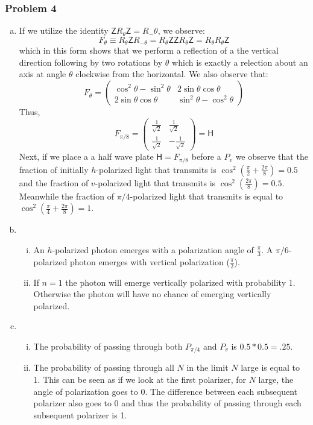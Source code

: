 \documentclass[a4paper,11pt]{article}
\begin{document}
\subsubsection*{Problem 4}
\begin{enumerate}[a)]
    \item If we utilize the identity $\mathsf{Z}R_\theta\mathsf{Z}=R_-\theta$, we observe:
        $$F_\theta\equiv R_\theta\mathsf{Z}R_{-\theta}=R_\theta\mathsf{Z}\mathsf{Z}R_\theta\mathsf{Z}=R_\theta R_\theta\mathsf{Z}$$
        which in this form shows that we perform a reflection of a the vertical direction following by two rotations by $\theta$ which is exactly a relection about an axis at angle $\theta$ clockwise from the horizontal. We also observe that:
        $$F_\theta=\left( \begin{array}{cc} \cos^2\theta-\sin^2\theta & 2\sin\theta\cos\theta \\ 2\sin\theta\cos\theta & \sin^2\theta-\cos^2\theta \end{array} \right)$$
        Thus, $$F_{\pi/8}=\left( \begin{array}{cc} \frac{1}{\sqrt{2}} &  \frac{1}{\sqrt{2}}\\  \frac{1}{\sqrt{2}}& -\frac{1}{\sqrt{2}}\end{array} \right)=\mathsf{H}$$
        Next, if we place a a half wave plate $\mathsf{H}=F_{\pi/8}$ before a $P_v$ we observe that the fraction of initially $h$-polarized light that transmits is $\cos^2(\frac{\pi}{2}+\frac{2\pi}{8})=0.5$ and the fraction of $v$-polarized light that transmits is $\cos^2(\frac{2\pi}{8})=0.5$. Meanwhile the fraction of $\pi/4$-polarized light that transmits is equal to $\cos^2(\frac{\pi}{4}+\frac{2\pi}{8})=1$.
    \item \begin{enumerate}[(i)]
            \item An $h$-polarized photon emerges with a polarization angle of $\frac{\pi}{3}$. A $\pi/6$-polarized photon emerges with vertical polarization ($\frac{\pi}{2}$).
            \item If $n=1$ the photon will emerge vertically polarized with probability 1. Otherwise the photon will have no chance of emerging vertically polarized.
        \end{enumerate}
    \item \begin{enumerate}[(i)]
            \item The probability of passing through both $P_{\pi/4}$ and $P_v$ is $0.5*0.5=.25$.
            \item The probability of passing through all $N$ in the limit $N$ large is equal to 1. This can be seen as if we look at the first polarizer, for $N$ large, the angle of polarization goes to 0. The difference between each subsequent polarizer also goes to 0 and thus the probability of passing through each subsequent polarizer is 1.
\end{enumerate}
\end{enumerate}
\end{document}
